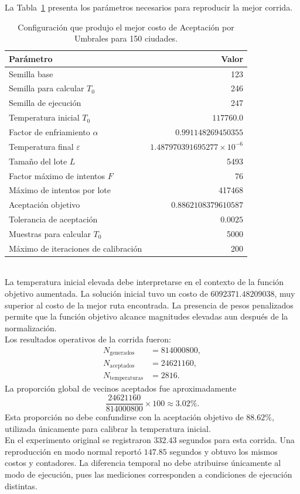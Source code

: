 \documentclass[12pt]{article}
\begin{document}
La Tabla~\ref{tab:resultados150-parametros} presenta los parámetros
necesarios para reproducir la mejor corrida.
\begin{table}[htbp]
    \centering
    \small
    \begin{tabular}{lr}
        \hline
        Parámetro & Valor \\
        \hline
        Semilla base & 123 \\
        Semilla para calcular $T_0$ & 246 \\
        Semilla de ejecución & 247 \\
        Temperatura inicial $T_0$ & $117760.0$ \\
        Factor de enfriamiento $\alpha$
            & $0.991148269450355$ \\
        Temperatura final $\varepsilon$
            & $1.487970391695277\times10^{-6}$ \\
        Tamaño del lote $L$ & 5493 \\
        Factor máximo de intentos $F$ & 76 \\
        Máximo de intentos por lote & 417468 \\
        Aceptación objetivo & $0.8862108379610587$ \\
        Tolerancia de aceptación & $0.0025$ \\
        Muestras para calcular $T_0$ & 5000 \\
        Máximo de iteraciones de calibración & 200 \\
        \hline
    \end{tabular}
    \caption{Configuración que produjo el mejor costo de
    Aceptación por Umbrales para 150 ciudades.}
    \label{tab:resultados150-parametros}
\end{table}
\\
La temperatura inicial elevada debe interpretarse en el contexto de
la función objetivo aumentada. La solución inicial tuvo un costo de
$6092371.48209038$, muy superior al costo de la mejor ruta encontrada.
La presencia de pesos penalizados permite que la función objetivo
alcance magnitudes elevadas aun después de la normalización.
\\
Los resultados operativos de la corrida fueron:
\[
\begin{aligned}
    N_{\mathrm{generados}} &= 814000800,\\
    N_{\mathrm{aceptados}} &= 24621160,\\
    N_{\mathrm{temperaturas}} &= 2816.
\end{aligned}
\]
La proporción global de vecinos aceptados fue aproximadamente
\[
    \frac{24621160}{814000800}\times100
    \approx 3.02\%.
\]
Esta proporción no debe confundirse con la aceptación objetivo de
$88.62\%$, utilizada únicamente para calibrar la temperatura inicial.
\\
En el experimento original se registraron $332.43$ segundos para
esta corrida. Una reproducción en modo normal reportó
$147.85$ segundos y obtuvo los mismos costos y contadores.
La diferencia temporal no debe atribuirse únicamente al modo de
ejecución, pues las mediciones corresponden a condiciones de
ejecución distintas.
\end{document}
